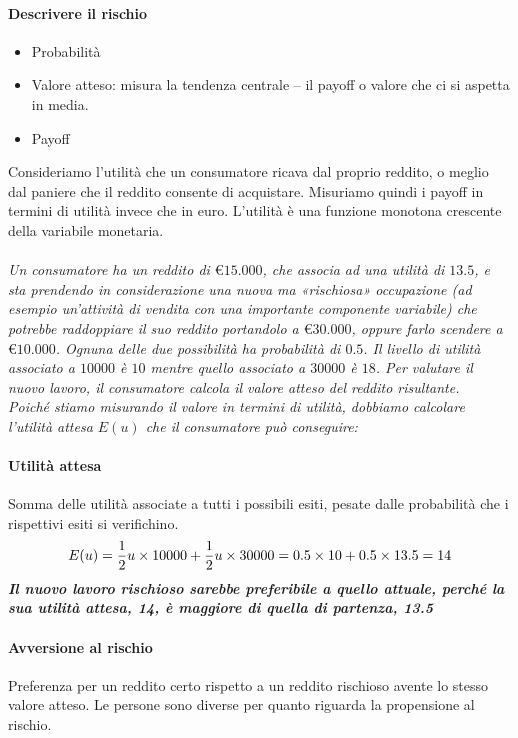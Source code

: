 \documentclass[12pt]{article}
\begin{document}
\paragraph{Descrivere il rischio}
\begin{itemize}
    \item Probabilità
    \item Valore atteso: misura la tendenza centrale – il payoff o valore che ci si aspetta in media.
    \item Payoff
\end{itemize}
Consideriamo l’utilità che un consumatore ricava dal proprio reddito, o meglio dal paniere che il reddito consente di acquistare.
Misuriamo quindi i payoff in termini di utilità invece che in euro. L’utilità è una funzione monotona crescente della variabile monetaria.
\\\\
\textit{Un consumatore ha un reddito di $€15.000$, che associa ad una utilità di $13.5$, e sta prendendo in considerazione una nuova ma «rischiosa» occupazione (ad esempio un’attività di vendita con una importante componente variabile) che potrebbe raddoppiare il suo reddito portandolo a $€30.000$, oppure farlo scendere a $€10.000$. Ognuna delle due possibilità ha probabilità di $0.5$. Il livello di utilità associato a $10000$ è $10$ mentre quello associato a $30000$ è $18$. Per valutare il nuovo lavoro, il consumatore calcola il valore atteso del reddito risultante.\\
    Poiché stiamo misurando il valore in termini di utilità, dobbiamo calcolare l’utilità attesa $E(u)$ che il consumatore può conseguire:}
\paragraph{Utilità attesa} Somma delle utilità associate a tutti i possibili esiti, pesate dalle probabilità che i rispettivi esiti si verifichino.
$$E(u) = {1\over 2}u \times {10000} + {1\over 2}u \times {30000} = 0.5 \times 10 + 0.5 \times 13.5 = 14$$
\textit{\textbf{Il nuovo lavoro rischioso sarebbe preferibile a quello attuale, perché la sua utilità attesa, 14, è maggiore di quella di partenza, 13.5}}
\paragraph{Avversione al rischio} Preferenza per un reddito certo rispetto a un reddito rischioso avente lo stesso valore atteso. Le persone sono diverse per quanto riguarda la propensione al rischio.
\end{document}
